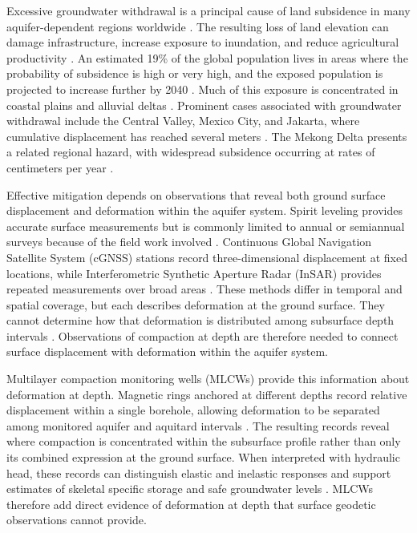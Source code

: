 Excessive groundwater withdrawal is a principal cause of land subsidence in many aquifer-dependent regions worldwide \citep{galloway_land_1999,herrera-garcia_mapping_2021,jasechko_rapid_2024,huning_global_2024}. The resulting loss of land elevation can damage infrastructure, increase exposure to inundation, and reduce agricultural productivity \citep{tzampoglou_selected_2023}. An estimated 19\% of the global population lives in areas where the probability of subsidence is high or very high, and the exposed population is projected to increase further by 2040 \citep{herrera-garcia_mapping_2021}. Much of this exposure is concentrated in coastal plains and alluvial deltas \citep{nicholls_global_2021,buffardi_issue_2023}. Prominent cases associated with groundwater withdrawal include the Central Valley, Mexico City, and Jakarta, where cumulative displacement has reached several meters \citep{miller_rapid_2020,chaussard_over_2021,chaussard_sinking_2013}. The Mekong Delta presents a related regional hazard, with widespread subsidence occurring at rates of centimeters per year \citep{erban_groundwater_2014, minderhoud_2017_mekong}.

Effective mitigation depends on observations that reveal both ground surface displacement and deformation within the aquifer system. Spirit leveling provides accurate surface measurements but is commonly limited to annual or semiannual surveys because of the field work involved \citep{poland_guidebook_1984,zhu_leveling_2020}. Continuous Global Navigation Satellite System (cGNSS) stations record three-dimensional displacement at fixed locations, while Interferometric Synthetic Aperture Radar (InSAR) provides repeated measurements over broad areas \citep{bock_physical_2016,galloway_application_2007}. These methods differ in temporal and spatial coverage, but each describes deformation at the ground surface. They cannot determine how that deformation is distributed among subsurface depth intervals \citep{zhang_inverse_2016,burbey_extensometer_2020}. Observations of compaction at depth are therefore needed to connect surface displacement with deformation within the aquifer system.

Multilayer compaction monitoring wells (MLCWs) provide this information about deformation at depth. Magnetic rings anchored at different depths record relative displacement within a single borehole, allowing deformation to be separated among monitored aquifer and aquitard intervals \citep{hung2015_multiple,hung_measuring_2021}. The resulting records reveal where compaction is concentrated within the subsurface profile rather than only its combined expression at the ground surface. When interpreted with hydraulic head, these records can distinguish elastic and inelastic responses and support estimates of skeletal specific storage and safe groundwater levels \citep{hung_measuring_2021}. MLCWs therefore add direct evidence of deformation at depth that surface geodetic observations cannot provide.

